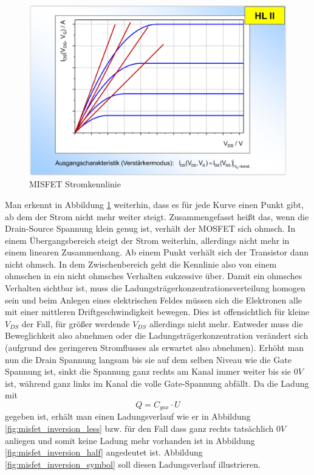 \documentclass[12pt,a4paper]{report}%
\numberwithin{equation}{section}
\numberwithin{equation}{subsection}
\begin{document}
	  \begin{figure}[H]
		  \centering
		  \captionsetup{justification=centering}
		  \includegraphics[width=0.8\linewidth]{misfet_kennlinie.png}
		  \caption{MISFET Stromkennlinie \protect\cite{MIKRO2}}
		  \label{fig:misfet_kennlinie}
		\end{figure}
		Man erkennt in Abbildung \ref{fig:misfet_kennlinie} weiterhin, dass es für jede Kurve einen Punkt gibt, ab dem der Strom nicht mehr weiter steigt. Zusammengefasst heißt das, wenn die Drain-Source Spannung klein genug ist, verhält der MOSFET sich ohmsch. In einem Übergangsbereich steigt der Strom weiterhin, allerdings nicht mehr in einem linearen Zusammenhang. Ab einem Punkt verhält sich der Transistor dann nicht ohmsch. In dem Zwischenbereich geht die Kennlinie also von einem ohmschen in ein nicht ohmsches Verhalten sukzessive über.\newline 
		Damit ein ohmsches Verhalten sichtbar ist, muss die Ladungsträgerkonzentrationsverteilung homogen sein und beim Anlegen eines elektrischen Feldes müssen sich die Elektronen alle mit einer mittleren Driftgeschwindigkeit bewegen. Dies ist offensichtlich für kleine $V_{DS}$ der Fall, für größer werdende $V_{DS}$ allerdings nicht mehr. Entweder muss die Beweglichkeit also abnehmen oder die Ladungsträgerkonzentration verändert sich (aufgrund des geringeren Stromflusses als erwartet also abnehmen). Erhöht man nun die Drain Spannung langsam bis sie auf dem selben Niveau wie die Gate Spannung ist, sinkt die Spannung ganz rechts am Kanal immer weiter bis sie $0V$ ist, während ganz links im Kanal die volle Gate-Spannung abfällt. Da die Ladung mit
		\begin{equation}
		  Q = C_{gox}\cdot U
		\end{equation}
		gegeben ist, erhält man einen Ladungsverlauf wie er in Abbildung \ref{fig:misfet_inversion_less} bzw. für den Fall dass ganz rechts tatsächlich $0V$ anliegen und somit keine Ladung mehr vorhanden ist in Abbildung \ref{fig:misfet_inversion_half} angedeutet ist. Abbildung \ref{fig:misfet_inversion_symbol} soll diesen Ladungsverlauf illustrieren.
\end{document}
